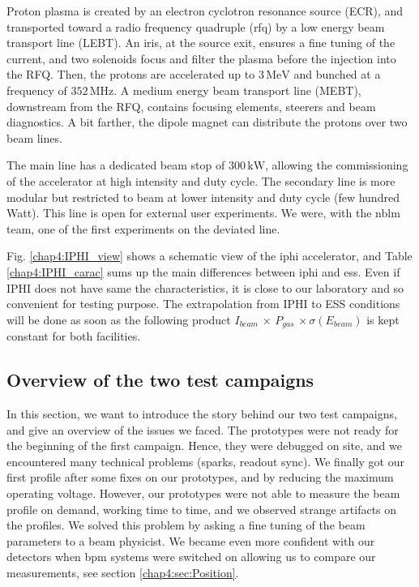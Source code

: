 \begin{refsection}
  Proton plasma is created by an electron cyclotron resonance source (ECR), and transported toward a radio frequency quadruple (\acrshort{rfq}) by a low energy beam transport line (LEBT).
  An iris, at the source exit, ensures a fine tuning of the current, and two solenoids focus and filter the plasma before the injection into the RFQ.
  Then, the protons are accelerated up to $3\,\mathrm{MeV}$ and bunched at a frequency of $352\,\mathrm{MHz}$.
  A medium energy beam transport line (MEBT), downstream from the RFQ, contains focusing elements, steerers and beam diagnostics.
  A bit farther, the dipole magnet can distribute the protons over two beam lines.

  

  The main line has a dedicated beam stop of $300\,\mathrm{kW}$, allowing the commissioning of the accelerator at high intensity and duty cycle.
  The secondary line is more modular but restricted to beam at lower intensity and duty cycle (few hundred Watt).
  This line is open for external user experiments.
  We were, with the \acrshort{nblm} team, one of the first experiments on the deviated line\cite{Senee:IPAC2018-TUPAF016}.

  Fig. \ref{chap4:IPHI_view} shows a schematic view of the \acrshort{iphi} accelerator, and Table \ref{chap4:IPHI_carac} sums up the main differences between \acrshort{iphi} and \acrshort{ess}. Even if IPHI does not have same the characteristics, it is close to our laboratory and so convenient for testing purpose. The extrapolation from IPHI to ESS conditions will be done as soon as the following product $I_{beam}\,\times\,P_{gas}\,\times\sigma(E_{beam})$ is kept constant for both facilities.

  

  \subsection{Overview of the two test campaigns}
  In this section, we want to introduce the story behind our two test campaigns, and give an overview of the issues we faced.
  The prototypes were not ready for the beginning of the first campaign.
  Hence, they were debugged on site, and we encountered many technical problems (sparks, readout sync).
  We finally got our first profile after some fixes on our prototypes, and by reducing the maximum operating voltage.
  However, our prototypes were not able to measure the beam profile on demand, working time to time, and we observed strange artifacts on the profiles.
  We solved this problem by asking a fine tuning of the beam parameters to a beam physicist.
  We became even more confident with our detectors when \acrfull{bpm} systems were switched on allowing us to compare our measurements, see section \ref{chap4:sec:Position}.


\end{refsection}
